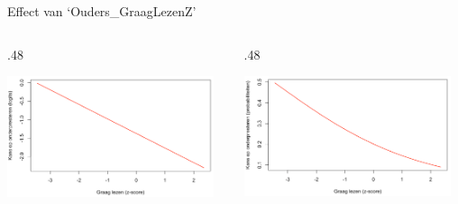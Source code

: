 \documentclass[
  10pt,
  ignorenonframetext,
]{beamer}
\def\begincols{\begin{columns}}
\def\begincol{\begin{column}}
\def\endcol{\end{column}}
\def\endcols{\end{columns}}
\begin{document}
\begin{frame}{Effect van `Ouders\_GraagLezenZ'}
\protect\hypertarget{effect-van-ouders_graaglezenz}{}

\begincols
  \begincol{.48\textwidth}
\begin{center}
\includegraphics[width=0.95\textwidth]{PlotLOG.png}
\end{center}
\endcol
  \begincol{.48\textwidth}
  \begin{center}
\includegraphics[width=0.95\textwidth]{PlotPROB.png}
\end{center}
\endcol
\endcols

\end{frame}
\end{document}
